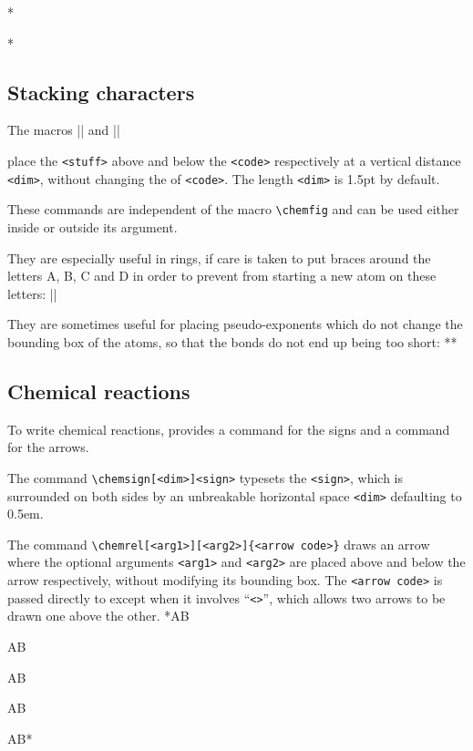 \documentclass[10pt]{article}
\begin{document}
\idx*{\lewis}*
	\par\bigskip
	*

\subsection{Stacking characters}
The macros\label{chemabove}\idx*{\chemabove}
\centerverb||
and\idx*{\chembelow}
\centerverb||
\smallskip

place the \verb-<stuff>- above and below the \verb-<code>- respectively at a vertical distance \verb-<dim>-, without changing the  of \verb-<code>-. The length \verb-<dim>- is 1.5pt by default.

These commands are independent of the macro \verb-\chemfig- and can be used either inside or outside its argument.

They are especially useful in rings, if care is taken to put braces around the letters A, B, C and D in order to prevent \CF from starting a new atom on these letters:
||

They are sometimes useful for placing pseudo-exponents which do not change the bounding box of the atoms, so that the bonds do not end up being too short:
**

\subsection{Chemical reactions}
To write chemical reactions, \CF provides a command for the signs and a command for the arrows.

\label{chemsign}The command \verb-\chemsign[<dim>]<sign>-\idx*{\chemsign} typesets the \verb-<sign>-, which is surrounded on both sides by an unbreakable horizontal space \verb-<dim>- defaulting to 0.5em.

\label{chemrel}The command \verb-\chemrel[<arg1>][<arg2>]{<arrow code>}-\idx*{\chemrel} draws an arrow where the optional arguments \verb-<arg1>- and \verb-<arg2>- are placed above and below the arrow respectively, without modifying its bounding box. The \verb-<arrow code>- is passed directly to \TIKZ except when it involves ``\verb/<>/'', which allows two arrows to be drawn one above the other.
*A\chemrel{->}B\par
A\chemrel{<-}B\par
A\chemrel{<->}B\par
A\chemrel{<>}B\par
AB*
\end{document}
